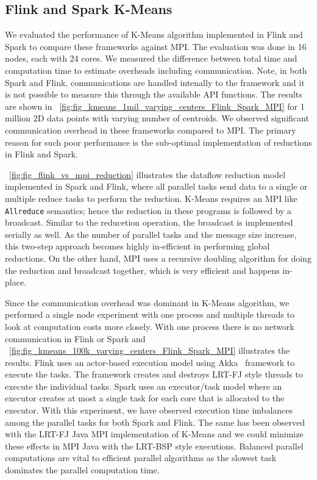 \documentclass[10pt, conference, compsocconf]{IEEEtran}
\begin{document}
\subsection{Flink and Spark K-Means}
We evaluated the performance of K-Means algorithm implemented in Flink and Spark to compare these frameworks against \ac{MPI}. The evaluation was done in 16 nodes, each with 24 cores. We measured the difference between total time and computation time to estimate overheads including communication. Note, in both Spark and Flink, communications are handled intenally to the framework and it is not possible to measure this through the available \ac{API} functions. The results are shown in \figurename~\ref{fig:fig_kmeans_1mil_varying_centers_Flink_Spark_MPI} for 1 million 2D data points with varying number of centroids. We observed significant communication overhead in these frameworks compared to \ac{MPI}. The primary reason for such poor performance is the sub-optimal implementation of reductions in Flink and Spark.

\figurename~\ref{fig:fig_flink_vs_mpi_reduction} illustrates the dataflow reduction model implemented in Spark and Flink, where all parallel tasks send data to a single or multiple reduce tasks to perform the reduction. K-Means requires an \ac{MPI} like \texttt{Allreduce} semantics; hence the reduction in these programs is followed by a broadcast. Similar to the reducetion operation, the broadcast is implemented serially as well. As the number of parallel tasks and the message size increase, this two-step approach becomes highly in-efficient in performing global reductions. On the other hand, \ac{MPI} uses a recursive doubling algorithm for doing the reduction and broadcast together, which is very efficient and happens in-place. 

Since the communication overhead was dominant in K-Means algorithm, we performed a single node experiment with one process and multiple threads to look at computation costs more closely. With one process there is no network communication in Flink or Spark and \figurename~\ref{fig:fig_kmeans_100k_varying_centers_Flink_Spark_MPI} illustrates the results. Flink uses an actor-based execution model using Akka~\cite{gupta2012akka} framework to execute the tasks. The framework creates and destroys \ac{LRT-FJ} style threads to execute the individual tasks. Spark uses an executor/task model where an executor creates at most a single task for each core that is allocated to the executor. With this experiment, we have observed execution time imbalances among the parallel tasks for both Spark and Flink. The same has been observed with the \ac{LRT-FJ} Java \ac{MPI} implementation of K-Means and we could minimize these effects in \ac{MPI} Java with the \ac{LRT-BSP} style executions. Balanced parallel computations are vital to efficient parallel algorithms as the slowest task dominates the parallel computation time. 
\end{document}
